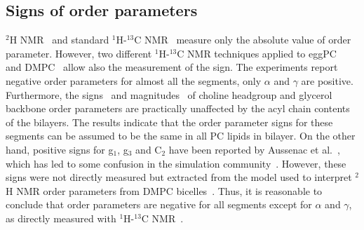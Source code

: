 \documentclass[aps,prl,superscriptaddress,twocolumn]{revtex4}
\begin{document}
\subsection{Signs of order parameters}\label{signSECTION}

$^2$H NMR~\cite{seelig77c} and standard $^1$H-$^{13}$C NMR~\cite{hong95a,gross97,dvinskikh05a,ferreira13} measure 
only the absolute value of order parameter. However, two different $^1$H-$^{13}$C NMR techniques applied to eggPC~\cite{hong95a} 
and DMPC~\cite{hong95a,gross97} allow also the measurement of the sign.
The experiments report negative order parameters for almost all the segments, only $\alpha$ and $\gamma$ are positive.
Furthermore, the signs~\cite{hong95a,hong95b,gross97} and magnitudes~\cite{gally81,ferreira13,botan15} of choline headgroup 
and glycerol backbone order parameters are practically unaffected by the acyl chain contents of the bilayers. 
The results indicate that the order parameter signs for these segments can be assumed to be the same in all PC lipids in bilayer. 
On the other hand, positive signs for g$_1$, g$_3$ and C$_2$ have been reported by Aussenac et al.~\cite{aussenac03}, which has led to some confusion in the simulation community~\cite{hogberg06,hogberg08,signPOST}. 
However, these signs were not directly measured but extracted from the model used to interpret 
$^2$H NMR order parameters from DMPC bicelles~\cite{aussenac03}. Thus, it is reasonable to conclude that 
order parameters are negative for all segments except for $\alpha$ and $\gamma$, as 
directly measured with $^1$H-$^{13}$C NMR~\cite{hong95a,hong95b,gross97}.

\end{document}
